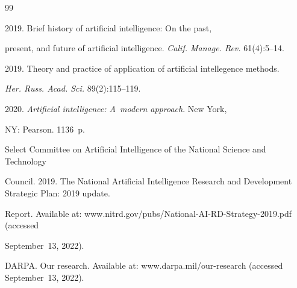 \renewcommand{\bibname}{\protect\rmfamily References}




{\small\frenchspacing

{ %


\begin{thebibliography}{99}



\vspace*{-4pt}






 2019. Brief history of artificial intelligence: On the past, 

present, and future of artificial intelligence. \textit{Calif. Manage. Rev.} 61(4):5--14.




 2019. Theory and practice of application of artificial intellegence methods. 

\textit{Her. Russ. Acad. Sci.} 89(2):115--119.




 2020. \textit{Artificial intelligence: A~modern approach}.  New York, 

NY: Pearson. 1136~p.




Select Committee on Artificial Intelligence of the National Science and Technology 

Council. 2019. The National Artificial Intelligence Research and Development Strategic Plan: 2019 update.  

Report.  Available at: {\sf www.nitrd.gov/pubs/National-AI-RD-Strategy-2019.pdf} (accessed 

September~13, 2022).




DARPA. Our research. Available at: {\sf www.darpa.mil/our-research} (accessed September~13, 2022).



\end{thebibliography}}}

